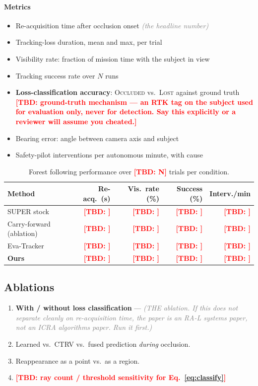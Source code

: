 \documentclass[conference]{IEEEtran}
\newcommand{\tbd}[1]{\textcolor{red}{\textbf{[TBD: #1]}}}
\newcommand{\note}[1]{\textcolor{gray}{\textit{(#1)}}}
\newcommand{\occluded}{\textsc{Occluded}}
\newcommand{\lost}{\textsc{Lost}}
\begin{document}
\paragraph{Metrics}
\begin{itemize}
  \item Re-acquisition time after occlusion onset \note{the headline number}
  \item Tracking-loss duration, mean and max, per trial
  \item Visibility rate: fraction of mission time with the subject in view
  \item Tracking success rate over $N$ runs
  \item \textbf{Loss-classification accuracy}: \occluded{} vs.\ \lost{} against
        ground truth \tbd{ground-truth mechanism --- an RTK tag on the subject
        used for evaluation only, never for detection. Say this explicitly or a
        reviewer will assume you cheated.}
  \item Bearing error: angle between camera axis and subject
  \item Safety-pilot interventions per autonomous minute, with cause
\end{itemize}

\begin{table}[t]
\centering
\caption{Forest following performance over \tbd{N} trials per condition.}
\label{tab:following}
\footnotesize
\begin{tabular}{@{}lrrrr@{}}
\toprule
Method & Re-acq.\ (s) & Vis.\ rate (\%) & Success (\%) & Interv./min \\
\midrule
SUPER stock~\cite{ren2025super}    & \tbd{} & \tbd{} & \tbd{} & \tbd{} \\
Carry-forward (ablation)           & \tbd{} & \tbd{} & \tbd{} & \tbd{} \\
Eva-Tracker~\cite{lin2026evatracker} & \tbd{} & \tbd{} & \tbd{} & \tbd{} \\
\textbf{Ours}                      & \tbd{} & \tbd{} & \tbd{} & \tbd{} \\
\bottomrule
\end{tabular}
\end{table}

\subsection{Ablations}
\begin{enumerate}
  \item \textbf{With / without loss classification} --- \note{THE ablation. If
        this does not separate cleanly on re-acquisition time, the paper is an
        RA-L systems paper, not an ICRA algorithms paper. Run it first.}
  \item Learned vs.\ CTRV vs.\ fused prediction \emph{during} occlusion.
  \item Reappearance as a point vs.\ as a region.
  \item \tbd{ray count / threshold sensitivity for Eq.~\eqref{eq:classify}}
\end{enumerate}
\end{document}

